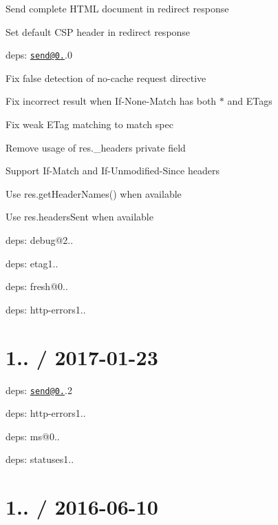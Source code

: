 \begin{DoxyItemize}
\item Send complete H\+T\+ML document in redirect response
\item Set default C\+SP header in redirect response
\item deps\+: \href{mailto:send@0.15}{\tt send@0.}.0
\begin{DoxyItemize}
\item Fix false detection of {\ttfamily no-\/cache} request directive
\item Fix incorrect result when {\ttfamily If-\/\+None-\/\+Match} has both {\ttfamily $\ast$} and E\+Tags
\item Fix weak {\ttfamily E\+Tag} matching to match spec
\item Remove usage of {\ttfamily res.\+\_\+headers} private field
\item Support {\ttfamily If-\/\+Match} and {\ttfamily If-\/\+Unmodified-\/\+Since} headers
\item Use {\ttfamily res.\+get\+Header\+Names()} when available
\item Use {\ttfamily res.\+headers\+Sent} when available
\item deps\+: debug@2..
\item deps\+: etag1..
\item deps\+: fresh@0..
\item deps\+: http-\/errors1..
\end{DoxyItemize}
\end{DoxyItemize}

\section*{1.. / 2017-\/01-\/23 }


\begin{DoxyItemize}
\item deps\+: \href{mailto:send@0.14}{\tt send@0.}.2
\begin{DoxyItemize}
\item deps\+: http-\/errors1..
\item deps\+: ms@0..
\item deps\+: statuses1..
\end{DoxyItemize}
\end{DoxyItemize}

\section*{1.. / 2016-\/06-\/10 }


